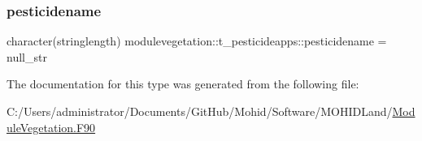 \subsubsection{\texorpdfstring{pesticidename}{pesticidename}}
{\footnotesize\ttfamily character(stringlength) modulevegetation\+::t\+\_\+pesticideapps\+::pesticidename = null\+\_\+str\hspace{0.3cm}{\ttfamily [private]}}



The documentation for this type was generated from the following file\+:\begin{DoxyCompactItemize}
\item 
C\+:/\+Users/administrator/\+Documents/\+Git\+Hub/\+Mohid/\+Software/\+M\+O\+H\+I\+D\+Land/\mbox{\hyperlink{_module_vegetation_8_f90}{Module\+Vegetation.\+F90}}\end{DoxyCompactItemize}

